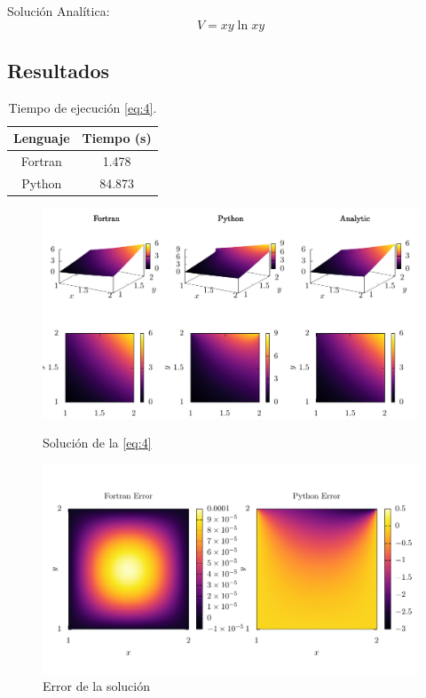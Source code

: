 \documentclass[12pt,a4paper]{article}
\begin{document}
Solución Analítica:
\begin{equation}
  V = xy \ln{xy}
\end{equation}

\subsection*{Resultados}%
\label{sub:Resultados-4}

\begin{table}[htbp!]
  \centering
  \begin{tabular}{@{}c|S[table-format=2.3]@{}}
    \toprule
    Lenguaje  & {Tiempo (s)} \\
    \midrule
    Fortran & 1.478 \\
    Python & 84.873 \\
    \bottomrule
  \end{tabular}
  \caption{Tiempo de ejecución \cref{eq:4}.}
\end{table}

\begin{figure}[H]
  \centering
  \includegraphics[width=\textwidth]{./comparison-04.pdf}
  \caption{Solución de la \cref{eq:4}}
  \includegraphics[width=\textwidth]{./error-04.pdf}
  \caption{Error de la solución}
\end{figure}
\end{document}
